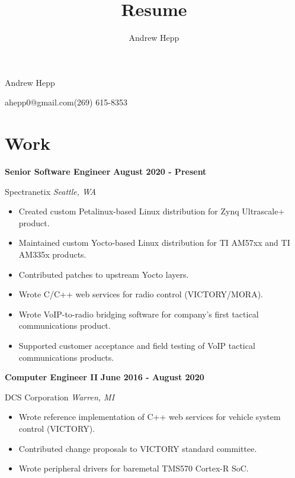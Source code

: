\documentclass{article}
\title{Resume}
\author{Andrew Hepp}
\newcommand{\experience}[4]{
    \noindent \textbf{#1} \hfill \textbf{#2} \par
    \noindent #3 \hfill \textit{#4} \par
}
\begin{document}
    \begin{center}
       \Huge Andrew Hepp \normalsize
    \end{center}
    ahepp0@gmail.com\hfill(269) 615-8353

    \section*{Work}
        \experience{Senior Software Engineer}{August 2020 - Present}{Spectranetix}{Seattle, WA}
        \begin{itemize}
            \item Created custom Petalinux-based Linux distribution for Zynq Ultrascale+ product.
            \item Maintained custom Yocto-based Linux distribution for TI AM57xx and TI AM335x products.
            \item Contributed patches to upstream Yocto layers.
            \item Wrote C/C++ web services for radio control (VICTORY/MORA).
            \item Wrote VoIP-to-radio bridging software for company's first tactical communications product.
            \item Supported customer acceptance and field testing of VoIP tactical communications products.
        \end{itemize}

        \experience{Computer Engineer II}{June 2016 - August 2020}{DCS Corporation}{Warren, MI}
        \begin{itemize}
            \item Wrote reference implementation of C++ web services for vehicle system control (VICTORY).
            \item Contributed change proposals to VICTORY standard committee.
            \item Wrote peripheral drivers for baremetal TMS570 Cortex-R SoC.
        \end{itemize}
\end{document}
